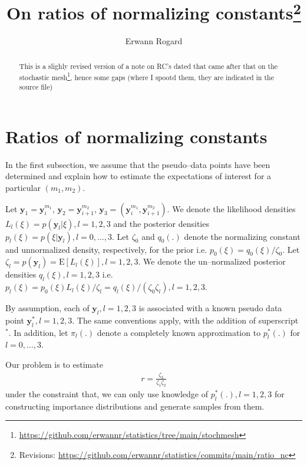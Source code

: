 \documentclass{article}
\begin{document}
\title{On ratios of normalizing constants\footnote{Revisions: \url{https://github.com/erwannr/statistics/commits/main/ratio_nc}}}
\author{Erwann Rogard}
\date{\ThisDate}

\maketitle

\begin{abstract}This is a slighly revised version of a note on RC's dated  that came after that on the stochastic mesh\footnote{\url{https://github.com/erwannr/statistics/tree/main/stochmesh}}, hence some gaps (where I spootd them, they are indicated in the source file)\end{abstract}

\section{Ratios of normalizing constants}
In the first subsection, %
we assume that the pseudo--data points have been determined and explain how to estimate the expectations of interest for a particular $(m_1,m_2)$. 

Let $\mathbf{y}_1=\mathbf{y}_{i}^{m_1}$, $\mathbf{y}_2=\mathbf{y}_{i+1}^{m_2}$, $\mathbf{y}_3=(\mathbf{y}_{i}^{m_1},\mathbf{y}_{i+1}^{m_2})$. We denote the likelihood densities $L_{l}(\xi)=p(\mathbf{y}_l|\xi),l=1,2,3$ and the posterior densities $p_l(\xi)=p(\xi|\mathbf{y}_l),l=0,\ldots,3$. Let $\zeta_0$ and $q_0(.)$ denote the normalizing constant and unnormalized density, respectively, for the prior i.e. $p_0(\xi)=q_0(\xi)/\zeta_0$. Let $\zeta_l=p(\mathbf{y}_l)=\mathrm{E}[L_l(\xi)],l=1,2,3$. We denote the un--normalized posterior densities $q_l(\xi),l=1,2,3$ i.e. $p_l(\xi)=p_0(\xi)L_l(\xi)/\zeta_l=q_l(\xi)/(\zeta_0\zeta_l),l=1,2,3$.

By assumption, each of $\mathbf{y}_l,l=1,2,3$ is associated with a known pseudo data point $\mathbf{y}_l^*,l=1,2,3$. The same conventions apply, with the addition of superscript $^*$. In addition, let $\pi_{l}(.)$ denote a completely known approximation to $p_l^*(.)$ for $l=0,\ldots,3$\cite[Chapter 9]{gelman2004}. %

Our problem is to estimate
\begin{align}
r=\frac{\zeta_{3}}{\zeta_{1} \zeta_{2}}
\end{align}under the constraint that, we can only use knowledge of $p_l^*(.),l=1,2,3$ for constructing importance distributions and generate samples from them. 
\end{document}
